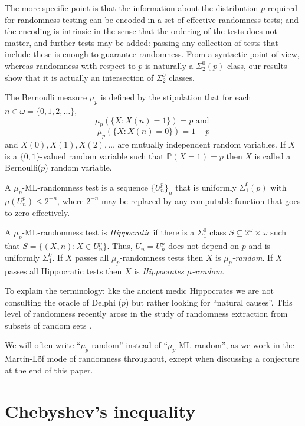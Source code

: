 The more specific point is that the information about the distribution $p$ required for randomness testing can be encoded in a set of effective randomness tests; and the encoding is intrinsic in the sense that the ordering of the tests does not matter, and further tests may be added: passing any collection of tests that include these is enough to guarantee randomness. From a syntactic point of view, whereas randomness with respect to $p$ is naturally a $\Sigma^0_2(p)$ class, our results show that it is actually an intersection of $\Sigma^0_{2}$ classes.

The Bernoulli measure $\mu_{p}$ is defined by the stipulation that for each $n\in\omega=\{0,1,2,\ldots\}$, 
\[
\mu_p(\{X: X(n)=1\})=p \text{ and }
\]
\[
\mu_p(\{X:X(n)=0\})=1-p
\]
and $X(0),X(1),X(2),\ldots$ are mutually independent random variables. If $X$ is a $\{0,1\}$-valued random variable such that $\mathbb P(X=1) = p$ then $X$ is called a Bernoulli($p$) random variable.
		

\begin{definition}
	A $\mu_p$-ML-randomness test is a sequence $\{U^p_n\}_n$ that is uniformly $\Sigma^0_1(p)$ with $\mu(U^p_n)\le 2^{-n}$, where $2^{-n}$ may be replaced by any computable function that goes to zero effectively. 
	 
	A $\mu_p$-ML-randomness test is \emph{Hippocratic} if there is a $\Sigma^0_1$ class $S\subseteq 2^\omega\times\omega$ such that $S=\{(X,n):X\in U_n^p\}$. Thus, $U_n=U_n^p$ does not depend on $p$ and is uniformly $\Sigma^0_1$.  
If $X$ passes all $\mu_p$-randomness tests then $X$ is \emph{$\mu_p$-random}. If $X$ passes all Hippocratic tests then $X$ is \emph{Hippocrates $\mu$-random}.
\end{definition}

To explain the terminology: like the ancient medic Hippocrates we are not consulting the oracle of Delphi ($p$) but rather looking for ``natural causes''. This level of randomness recently arose in the study of randomness extraction from subsets of random sets \cite{MRL}.

We will often write ``$\mu_p$-random'' instead of ``$\mu_p$-ML-random'', as we work in the Martin-L\"of mode of randomness throughout, except when discussing a conjecture at the end of this paper.



\section{Chebyshev's inequality}

